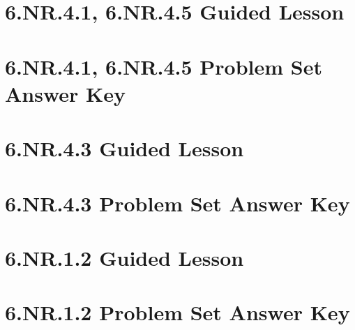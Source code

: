\documentclass[a4paper,12pt]{article}
\title{}
\date{}
\begin{document}


\hypertarget{toc}{}  %
\tableofcontents
\newpage



\pagestyle{fancy}  %
\newpage
\section{6.NR.4.1, 6.NR.4.5 Guided Lesson}


\newpage
\section{6.NR.4.1, 6.NR.4.5 Problem Set Answer Key}


\newpage
\section{6.NR.4.3 Guided Lesson}


\newpage
\section{6.NR.4.3 Problem Set Answer Key}


\newpage
\section{6.NR.1.2 Guided Lesson}


\newpage
\section{6.NR.1.2 Problem Set Answer Key}

\end{document}
